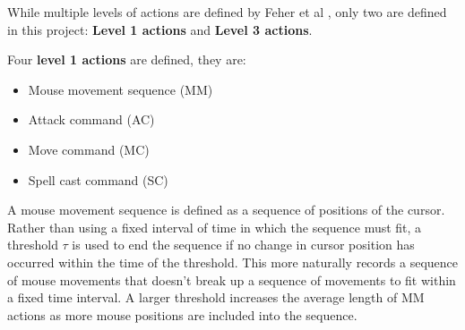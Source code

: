 \documentclass{../sty/SizheArticle}
\begin{document}
While multiple levels of actions are defined by Feher et al \cite{mouse-dynamics}, only two are defined in this project: \textbf{Level 1 actions} and \textbf{Level 3 actions}.

Four \textbf{level 1 actions} are defined, they are:
\begin{itemize}
\item Mouse movement sequence (MM)
\item Attack command (AC)
\item Move command (MC)
\item Spell cast command (SC)
\end{itemize}
A mouse movement sequence is defined as a sequence of positions of the cursor. Rather than using a fixed interval of time in which the sequence must fit, a threshold $\tau$ is used to end the sequence if no change in cursor position has occurred within the time of the threshold. This more naturally records a sequence of mouse movements that doesn't break up a sequence of movements to fit within a fixed time interval. A larger threshold increases the average length of MM actions as more mouse positions are included into the sequence. 
\end{document}
